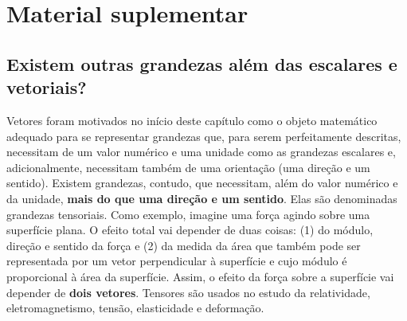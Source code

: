 















\section{Material suplementar}
\label{\detokenize{GE101-E:material-suplementar}}

\subsection{Existem outras grandezas além das escalares e vetoriais?}
\label{\detokenize{GE101-E:existem-outras-grandezas-alem-das-escalares-e-vetoriais}}
Vetores foram motivados no início deste capítulo como o objeto matemático adequado para se representar grandezas que, para serem perfeitamente descritas, necessitam de um valor numérico e uma unidade \textendash{} como as grandezas escalares \textendash{} e, adicionalmente, necessitam também de uma orientação (uma direção e um sentido). Existem grandezas, contudo, que necessitam, além do valor numérico e da unidade, \textbf{mais do que uma direção e um sentido}. Elas são denominadas grandezas tensoriais. Como exemplo, imagine uma força agindo sobre uma superfície plana. O efeito total vai depender de duas coisas: (1) do módulo, direção e sentido da força e (2) da medida da área que também pode ser representada por um vetor perpendicular à superfície e cujo módulo é proporcional à área da superfície. Assim, o efeito da força sobre a superfície vai depender de \textbf{dois vetores}. Tensores são usados no estudo da relatividade, eletromagnetismo, tensão, elasticidade e deformação.

